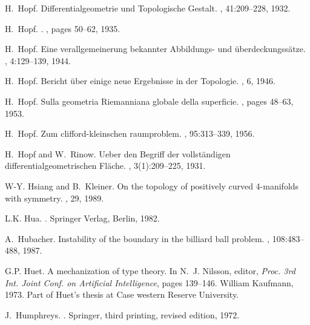 \documentclass[12pt]{amsart}
\begin{document}
\begin{thebibliography}{100}
H.~Hopf.
\newblock Differentialgeometrie und {T}opologische {G}estalt.
,
  41:209--228, 1932.

H.~Hopf.
.
, pages 50--62, 1935.

H.~Hopf.
\newblock Eine verallgemeinerung bekannter {A}bbildungs- und
  {\"u}berdeckungs{s\"a}tze.
, 4:129--139, 1944.

H.~Hopf.
\newblock Bericht {\"u}ber einige neue {E}rgebnisse in der {T}opologie.
, 6, 1946.

H.~Hopf.
\newblock Sulla geometria {R}iemanniana globale della superficie.
, pages
  48--63, 1953.

H.~Hopf.
\newblock Zum clifford-kleinschen raumproblem.
, 95:313--339, 1956.

H.~Hopf and W.~Rinow.
\newblock Ueber den {B}egriff der vollst\"{a}ndigen differentialgeometrischen
  {F}l\"{a}che.
, 3(1):209--225, 1931.

W-Y. Hsiang and B.~Kleiner.
\newblock On the topology of positively curved 4-manifolds with symmetry.
, 29, 1989.

L.K. Hua.
.
\newblock Springer Verlag, Berlin, 1982.

A.~Hubacher.
\newblock Instability of the boundary in the billiard ball problem.
, 108:483--488, 1987.

G.P. Huet.
\newblock A mechanization of type theory.
\newblock In N.~J. Nilsson, editor, {\em Proc. 3rd Int. Joint Conf. on
  Artificial Intelligence}, pages 139--146. William Kaufmann, 1973.
\newblock Part of Huet's thesis at Case western Reserve University.

J.~Humphreys.
.
\newblock Springer, third printing, revised edition, 1972.


\end{thebibliography}
\end{document}
